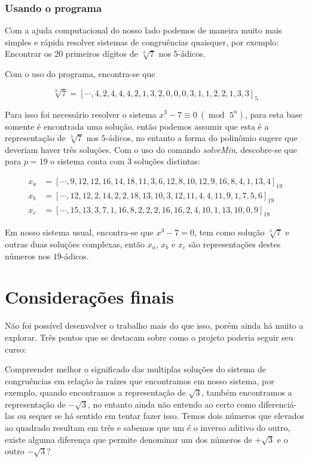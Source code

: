 \documentclass{report}
\newcommand*{\padc}[2]{\left[#1\right]_{#2}}
\DeclareMathOperator{\modulo}{mod \ }
\theoremstyle{definition}
\begin{document}
\subsubsection*{Usando o programa}

Com a ajuda computacional do nosso lado podemos de maneira muito mais simples e rápida resolver sistemas de congruências quaisquer, por exemplo: Encontrar os 20 primeiros dígitos de $\sqrt[3]{7}$ nos 5-ádicos.

Com o uso do programa, encontra-se que

\begin{equation*}
    \sqrt[3]{7} = \padc{\cdots, 4, 2, 4, 4, 4, 2, 1, 3, 2, 0, 0, 0, 3, 1, 1, 2, 2, 1, 3, 3}{5}
\end{equation*}

Para isso foi necessário resolver o sistema $x^3 - 7 \equiv 0 \ (\modulo 5^n)$, para esta base somente é encontrada uma solução, então podemos assumir que esta é a representação de $\sqrt[3]{7}$ nos $5$-ádicos, no entanto a forma do polinômio sugere que deveriam haver três soluções. Com o uso do comando \emph{solveMin}, descobre-se que para $p=19$ o sistema conta com 3 soluções distintas:

\begin{align*}
    x_a &= \padc{\cdots, 9, 12, 12, 16, 14, 18, 11, 3, 6, 12, 8, 10, 12, 9, 16, 8, 4, 1, 13, 4 }{19}\\
    x_b &= \padc{\cdots, 12, 12, 2, 14, 2, 2, 18, 13, 10, 3, 12, 11, 4, 4, 11, 9, 1, 7, 5, 6 }{19}\\
    x_c &= \padc{\cdots, 15, 13, 3, 7, 1, 16, 8, 2, 2, 2, 16, 16, 2, 4, 10, 1, 13, 10, 0, 9 }{19}
\end{align*}

Em nosso sistema usual, encontra-se que $x^3 - 7 = 0$, tem como solução $\sqrt[3]{7}$ e outras duas soluções complexas, então $x_a$, $x_b$ e $x_c$ são representações destes números nos $19$-ádicos.

\section{Considerações finais}

Não foi possível desenvolver o trabalho mais do que isso, porém ainda há muito a explorar. Três pontos que se destacam sobre como o projeto poderia seguir seu curso:

Compreender melhor o significado das multiplas soluções do sistema de congruências em relação às raízes que encontramos em nosso sistema, por exemplo, quando encontramos a representação de $\sqrt3$, também encontramos a representação de $-\sqrt3$, no entanto ainda não entendo ao certo como diferenciá-las ou sequer se há sentido em tentar fazer isso. Temos dois números que elevados ao quadrado resultam em três e sabemos que um é o inverso aditivo do outro, existe alguma diferença que permite denominar um dos números de $+\sqrt3$ e o outro $-\sqrt3$?
\end{document}
